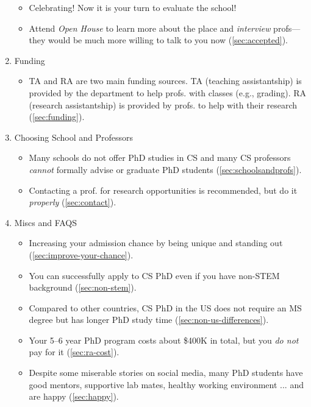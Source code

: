 \documentclass[oneside,11pt]{memoir}
\begin{document}
\begin{enumerate}
\begin{itemize}
                \item  Celebrating! Now it is your turn to evaluate the school!
          \item Attend \emph{Open House} to learn more about the place and \emph{interview} profs---they would be much more willing to talk to you now (\autoref{sec:accepted}).
        \end{itemize}
  \item Funding
        \begin{itemize}
          \item TA and RA are two main funding sources.  TA (teaching assistantship) is provided by the department to help profs. with classes (e.g., grading). RA (research assistantship) is provided by profs. to help with their research (\autoref{sec:funding}).
        \end{itemize}
  \item Choosing School and Professors
        \begin{itemize}
          \item Many schools do not offer PhD studies in CS and many CS professors \emph{cannot} formally advise or graduate PhD students  (\autoref{sec:schoolsandprofs}).
          \item Contacting a prof. for research opportunities is recommended, but do it \emph{properly} (\autoref{sec:contact}).
        \end{itemize}
  \item Miscs and FAQS
        \begin{itemize}
          \item Increasing your admission chance by being unique and standing out (\autoref{sec:improve-your-chance}).
          \item You can successfully apply to CS PhD even if you have non-STEM background (\autoref{sec:non-stem}).
          \item Compared to other countries, CS PhD in the US does not require an MS degree but has longer PhD study time (\autoref{sec:non-us-differences}).
          \item Your 5--6 year PhD program costs about \$400K in total, but you \emph{do not} pay for it (\autoref{sec:ra-cost}).
          \item Despite some miserable stories on social media, many PhD students have good mentors, supportive lab mates, healthy working environment ... and are happy (\autoref{sec:happy}).
        \end{itemize}
\end{enumerate}
\end{document}
